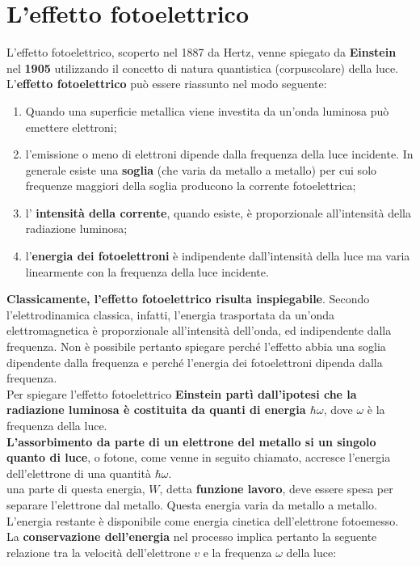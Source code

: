 \documentclass[a4paper,12pt,oneside]{book}
\begin{document}
\section{L'effetto fotoelettrico}
L'effetto fotoelettrico, scoperto nel 1887 da Hertz, venne spiegato da \textbf{Einstein} nel \textbf{1905} utilizzando il concetto di natura quantistica (corpuscolare) della luce.\\
L'\textbf{effetto fotoelettrico} può essere riassunto nel modo seguente:
\begin{enumerate}
\item Quando una superficie metallica viene investita da un'onda luminosa può emettere elettroni;
\item  l'emissione o meno di elettroni dipende dalla frequenza della luce incidente. In generale esiste una \textbf{soglia} (che varia da metallo a metallo) per cui solo frequenze maggiori della soglia producono la corrente fotoelettrica;
\item l' \textbf{intensità della corrente}, quando esiste, è proporzionale all'intensità della radiazione luminosa;
\item l'\textbf{energia dei fotoelettroni} è indipendente dall'intensità della luce ma varia linearmente con la frequenza della luce incidente.
\end{enumerate} 
\textbf{Classicamente, l'effetto fotoelettrico risulta inspiegabile}. Secondo l'elettrodinamica classica, infatti, l'energia trasportata da un'onda elettromagnetica è proporzionale all'intensità dell'onda, ed indipendente dalla frequenza. Non è possibile pertanto spiegare perché l'effetto abbia una soglia dipendente dalla frequenza e perché l'energia dei fotoelettroni dipenda dalla frequenza.\\
Per spiegare l'effetto fotoelettrico \textbf{Einstein partì dall'ipotesi che la radiazione luminosa è costituita da quanti di energia $\hbar \omega$}, dove $\omega$ è la frequenza della luce.\\
\textbf{L'assorbimento da parte di un elettrone del metallo si un singolo quanto di luce}, o fotone, come venne in seguito chiamato, accresce l'energia dell'elettrone di una quantità $\hbar \omega$.\\
una parte di questa energia, $W$, detta \textbf{funzione lavoro}, deve essere spesa per separare l'elettrone dal metallo. Questa energia varia da metallo a metallo. L'energia restante è disponibile come energia cinetica dell'elettrone fotoemesso. La \textbf{conservazione dell'energia} nel processo implica pertanto la seguente relazione tra la velocità dell'elettrone $v$ e la frequenza $\omega$ della luce:
\end{document}
